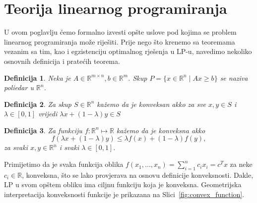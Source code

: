 \documentclass[a4paper, utf8, 11pt, colorlinks]{book}
\newtheorem{definition}{Definicija}[chapter]
\theoremstyle{definition}
\begin{document}
\section{Teorija linearnog programiranja}
U ovom poglavlju ćemo formalno izvesti opšte uslove pod kojima se problem linearnog programiranja može riješiti. Prije nego što krenemo sa teoremama vezanim sa tim, kao i egzistenciju optimalnog rješenja u LP-u, navedimo nekoliko osnovnih definicija i pratećih teorema. 
 \begin{definition}
	Neka je $A \in \mathbb{R}^{m \times n}, b \in \mathbb{R}^m$. Skup $P=\{x \in \mathbb{R}^n \mid Ax \geq b\}$ se naziva poliedar u $\mathbb{R}^n$. 
\end{definition}


\begin{definition}
  Za skup $S \in \mathbb{R}^n$ kažemo da je konveksan akko za sve $x,y\in S$ i $\lambda\in [0, 1]$ vrijedi $\lambda x + (1 - \lambda)y \in S$
\end{definition}
\begin{definition}
   Za funkciju $f:\mathbb{R}^n \mapsto \mathbb{R}$ kažemo da je konveksna akko 
   $$ f( \lambda x + (1-\lambda) y) \leq \lambda f(x) + (1 -\lambda) f(y),$$
   za svaki $x,y \in \mathbb{R}^n$ i svaki $\lambda \in [0,1].$
\end{definition}
 Primijetimo da je svaka funkcija oblika $f(x_1, \ldots, x_n) = \sum_{i=1}^n c_i x_i = c^T x$ za neke $c_i \in \mathbb{R}$, konveksna, što se lako provjerava na osnovu definicije konveksnosti. Dakle, LP u svom opštem obliku  ima ciljnu funkciju koja je konveksna. Geometrijska interpretacija konveksnosti funkcije je prikazana na Slici~\ref{fig:convex_function}.
\end{document}
